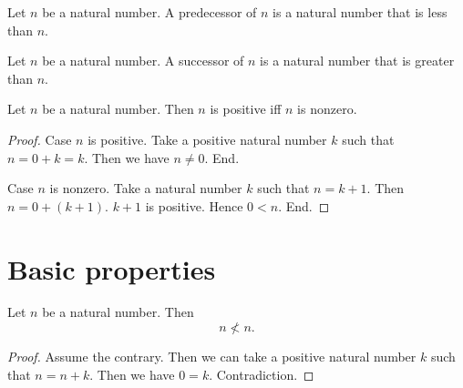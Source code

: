 \documentclass[../arithmetic.tex]{subfiles}
\begin{document}
  \begin{forthel}
    \begin{definition}
      Let $n$ be a natural number.
      A predecessor of $n$ is a natural number that is less than $n$.
    \end{definition}
  \end{forthel}

  \begin{forthel}
    \begin{definition}
      Let $n$ be a natural number.
      A successor of $n$ is a natural number that is greater than $n$.
    \end{definition}
  \end{forthel}

  \begin{forthel}
    \begin{proposition}
      Let $n$ be a natural number.
      Then $n$ is positive iff $n$ is nonzero.
    \end{proposition}
    \begin{proof}
      Case $n$ is positive.
        Take a positive natural number $k$ such that $n = 0 \plus k = k$.
        Then we have $n \neq 0$.
      End.

      Case $n$ is nonzero.
        Take a natural number $k$ such that $n = k \plus 1$.
        Then $n = 0 \plus (k \plus 1)$.
        $k \plus 1$ is positive.
        Hence $0 \less n$.
      End.
    \end{proof}
  \end{forthel}


  \section{Basic properties}

  \begin{forthel}
    \begin{proposition}
      Let $n$ be a natural number.
      Then \[ n \nless n. \]
    \end{proposition}
    \begin{proof}
      Assume the contrary.
      Then we can take a positive natural number $k$ such that $n = n \plus k$.
      Then we have $0 = k$.
      Contradiction.
    \end{proof}
  \end{forthel}
\end{document}

